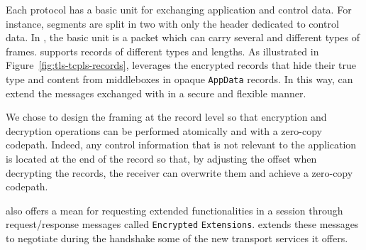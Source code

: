 Each protocol has a basic unit for exchanging application and control data.
For instance, \tcp segments are split in two with only the header dedicated to 
control data. In \quic, the basic unit is a \quic packet which can carry 
several and different types of \quic frames. \tls supports \tls records of 
different types and lengths.  As illustrated in 
Figure~\ref{fig:tls-tcpls-records}, \tcpls leverages the \tls encrypted records 
that hide their true type and content from middleboxes in opaque 
\texttt{AppData} records. In this way, \tcpls can extend the messages exchanged 
with \tls in a secure and flexible manner.

We chose to design the \tcpls framing at the \tls record level so that
encryption and decryption operations can be performed atomically and with
a zero-copy codepath. Indeed, any \tcpls control information that is not relevant to the application is
located at the end of the record so that, by adjusting the offset when
decrypting the \tcpls records, the receiver can overwrite them and achieve a zero-copy codepath.


\tls also offers a mean for requesting extended functionalities in a \tls
session through request/response messages called \tls \texttt{Encrypted}
\texttt{Extensions}.
\tcpls extends these messages to negotiate during the handshake some of the new
transport services it offers.

